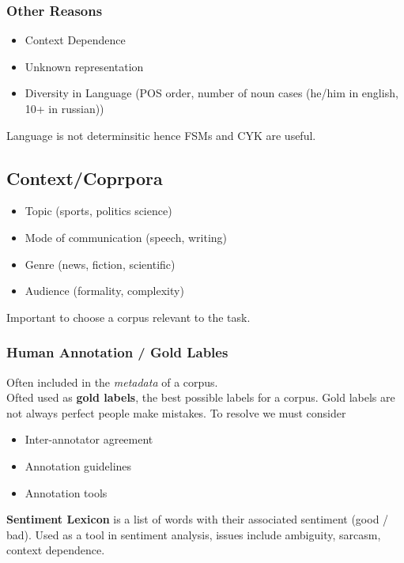 \documentclass[8pt]{extarticle} %
\begin{document}
\begin{multicols*}{3}
\subsubsection*{Other Reasons}
\begin{itemize}[label=\textbullet, labelsep=0.3em, leftmargin=0.5em, itemsep=0em]
\item Context Dependence
\item Unknown representation
\item Diversity in Language (POS order, number of noun cases (he/him in english, 10+ in russian))
\end{itemize}
Language is not determinsitic hence FSMs and CYK are useful. 

\subsection*{Context/Coprpora}
\begin{itemize}[label=\textbullet, labelsep=0.3em, leftmargin=0.5em, itemsep=0em]
    \item Topic (sports, politics science)
    \item Mode of communication (speech, writing)
    \item Genre (news, fiction, scientific)
    \item Audience (formality, complexity)
\end{itemize}
Important to choose a corpus relevant to the task.

\subsubsection*{Human Annotation / Gold Lables}
Often included in the \textit{metadata} of a corpus.\\
Ofted used as \textbf{gold labels}, the best possible labels for a corpus. Gold labels are not always perfect people make mistakes.
To resolve we must consider
\begin{itemize}[label=\textbullet, labelsep=0.3em, leftmargin=0.5em, itemsep=0em]
    \item Inter-annotator agreement
    \item Annotation guidelines
    \item Annotation tools
\end{itemize}

\textbf{Sentiment Lexicon} is a list of words with their associated sentiment (good / bad). Used as a tool in sentiment analysis, issues include ambiguity, sarcasm, context dependence. 


\end{multicols*}
\end{document}
